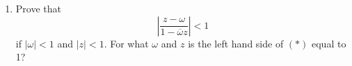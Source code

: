 \documentclass[12pt,leqno]{book}
\theoremstyle{definition}
\newcommand{\re}{\operatorname{Re}}
\newcommand{\im}{\operatorname{Im}}
\newcommand{\w}{\omega}
\newenvironment{Solution}{\begin{proof}[\textnormal{\textbf{Solution}}]}{\end{proof}}
\begin{document}
\begin{enumerate}
\begin{Solution}
\begin{itemize}
    \item We rewrite $\frac{1}{x+iy}$ as follows: \[\frac{1}{x+iy}=\frac{x-iy}{(x+iy)(x-iy)}=\frac{x-iy}{x^2-y^2}\] hence the real part and imaginary part of $\frac{1}{z}$ are \[\frac{x}{x^2-y^2}\text{ and }\frac{-y}{x^2-y^2}\] respectively.
    \item Similarly, we have \begin{align*}\frac{z-1}{z+1}&=\frac{(z-1)(\overline{z}+1)}{(z+1)(\overline{z}+1)}\\&=\frac{z\overline{z}+(z-\overline{z})-1}{z\overline{z}+(z+\overline{z})+1}\\&=\frac{|z|+2i\im z-1}{|z|+2\re{z}+1}\end{align*} Hence the real part and imaginary part of $\frac{z-1}{z+1}$ are \[\frac{|z|-1}{|z|+2x+1}\text{ and }\frac{2y}{|z|+2x+1}\] respectively.
    \item We begin by writing $z^2=(x+iy)^2=x^2-y^2+2ixy$. Then \[\frac{1}{z^2}=\frac{\overline{z}^2}{z^2\overline{z}^2}=\frac{\overline{z}^2}{|z|^2}\] Hence the real part and imaginary part of $\frac{1}{z^2}$ are \[\frac{x^2-y^2}{|z|^2}\text{ and }\frac{-2xy}{|z|^2}\] respectively.
   \end{itemize}
  \end{Solution}
 \item Prove that \[\left|\frac{z-\w}{1-\overline{\w}z}\right|<1\tag{*}\] if $|\w|<1$ and $|z|<1$. For what $\w$ and $z$ is the left hand side of $(*)$ equal to 1?
\end{enumerate}
\end{document}
